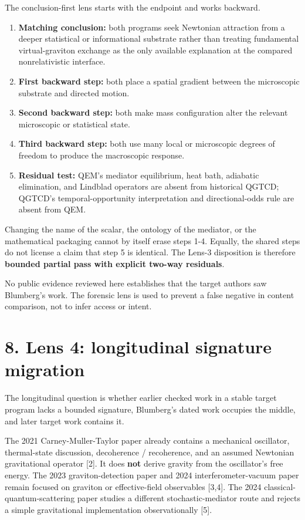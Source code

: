 \documentclass[
  american,
  11pt,
  letterpaper,
]{article}
\providecommand{\tightlist}{%
  \setlength{\itemsep}{0pt}\setlength{\parskip}{0pt}}
\begin{document}
The conclusion-first lens starts with the endpoint and works backward.

\begin{enumerate}
\def\labelenumi{\arabic{enumi}.}
\tightlist
\item
  \textbf{Matching conclusion:} both programs seek Newtonian attraction from a deeper statistical or informational substrate rather than treating fundamental virtual-graviton exchange as the only available explanation at the compared nonrelativistic interface.
\item
  \textbf{First backward step:} both place a spatial gradient between the microscopic substrate and directed motion.
\item
  \textbf{Second backward step:} both make mass configuration alter the relevant microscopic or statistical state.
\item
  \textbf{Third backward step:} both use many local or microscopic degrees of freedom to produce the macroscopic response.
\item
  \textbf{Residual test:} QEM's mediator equilibrium, heat bath, adiabatic elimination, and Lindblad operators are absent from historical QGTCD; QGTCD's temporal-opportunity interpretation and directional-odds rule are absent from QEM.
\end{enumerate}

Changing the name of the scalar, the ontology of the mediator, or the mathematical packaging cannot by itself erase steps 1-4. Equally, the shared steps do not license a claim that step 5 is identical. The Lens-3 disposition is therefore \textbf{bounded partial pass with explicit two-way residuals}.

No public evidence reviewed here establishes that the target authors saw Blumberg's work. The forensic lens is used to prevent a false negative in content comparison, not to infer access or intent.

\section{8. Lens 4: longitudinal signature migration}\label{lens-4-longitudinal-signature-migration}

The longitudinal question is whether earlier checked work in a stable target program lacks a bounded signature, Blumberg's dated work occupies the middle, and later target work contains it.

The 2021 Carney-Muller-Taylor paper already contains a mechanical oscillator, thermal-state discussion, decoherence / recoherence, and an assumed Newtonian gravitational operator {[}2{]}. It does \textbf{not} derive gravity from the oscillator's free energy. The 2023 graviton-detection paper and 2024 interferometer-vacuum paper remain focused on graviton or effective-field observables {[}3,4{]}. The 2024 classical-quantum-scattering paper studies a different stochastic-mediator route and rejects a simple gravitational implementation observationally {[}5{]}.
\end{document}
